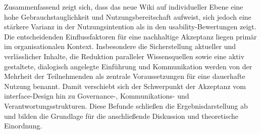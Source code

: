 Zusammenfassend zeigt sich, dass das neue Wiki auf individueller Ebene eine hohe Gebrauchstauglichkeit und Nutzungsbereitschaft aufweist, sich jedoch eine stärkere Varianz in der Nutzungsintention als in den \Gls{usability}-Bewertungen zeigt. Die entscheidenden Einflussfaktoren für eine nachhaltige Akzeptanz liegen primär im organisationalen Kontext. Insbesondere die Sicherstellung aktueller und verlässlicher Inhalte, die Reduktion paralleler Wissensquellen sowie eine aktiv gestaltete, dialogisch angelegte Einführung und Kommunikation werden von der Mehrheit der Teilnehmenden als zentrale Voraussetzungen für eine dauerhafte Nutzung benannt. Damit verschiebt sich der Schwerpunkt der Akzeptanz vom \Gls{interface}-Design hin zu Governance-, Kommunikations- und Verantwortungsstrukturen. Diese Befunde schließen die Ergebnisdarstellung ab und bilden die Grundlage für die anschließende Diskussion und theoretische Einordnung.
